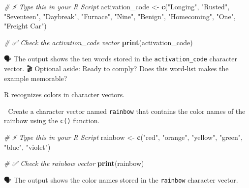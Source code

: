 \documentclass[
  12pt,
]{scrreprt}
\newenvironment{Shaded}{\begin{snugshade}}{\end{snugshade}}
\newcommand{\CommentTok}[1]{\textcolor[rgb]{0.56,0.35,0.01}{\textit{#1}}}
\newcommand{\FunctionTok}[1]{\textcolor[rgb]{0.13,0.29,0.53}{\textbf{#1}}}
\newcommand{\NormalTok}[1]{#1}
\newcommand{\OtherTok}[1]{\textcolor[rgb]{0.56,0.35,0.01}{#1}}
\newcommand{\StringTok}[1]{\textcolor[rgb]{0.31,0.60,0.02}{#1}}
\begin{document}
\begin{Shaded}
\begin{Highlighting}[]
\CommentTok{\# ⚡ Type this in your R Script}
\NormalTok{activation\_code }\OtherTok{\textless{}{-}} \FunctionTok{c}\NormalTok{(}\StringTok{"Longing"}\NormalTok{, }\StringTok{"Rusted"}\NormalTok{, }\StringTok{"Seventeen"}\NormalTok{, }\StringTok{"Daybreak"}\NormalTok{, }\StringTok{"Furnace"}\NormalTok{, }\StringTok{"Nine"}\NormalTok{, }\StringTok{"Benign"}\NormalTok{, }\StringTok{"Homecoming"}\NormalTok{, }\StringTok{"One"}\NormalTok{, }\StringTok{"Freight Car"}\NormalTok{)}
\end{Highlighting}
\end{Shaded}

\begin{Shaded}
\begin{Highlighting}[]
\CommentTok{\# ✅ Check the activation\_code vector}
\FunctionTok{print}\NormalTok{(activation\_code)}
\end{Highlighting}
\end{Shaded}

🗣 The output shows the ten words stored in the \texttt{activation\_code}
character vector. 🎬 Optional aside: Ready to comply? Does this
word-list makes the example memorable?

R recognizes colors in character vectors.

🎯 Create a character vector named \texttt{rainbow} that contains the
color names of the rainbow using the \texttt{c()} function.

\begin{Shaded}
\begin{Highlighting}[]
\CommentTok{\# ⚡ Type this in your R Script}
\NormalTok{rainbow }\OtherTok{\textless{}{-}} \FunctionTok{c}\NormalTok{(}\StringTok{"red"}\NormalTok{, }\StringTok{"orange"}\NormalTok{, }\StringTok{"yellow"}\NormalTok{, }\StringTok{"green"}\NormalTok{, }\StringTok{"blue"}\NormalTok{,  }\StringTok{"violet"}\NormalTok{)}
\end{Highlighting}
\end{Shaded}

\begin{Shaded}
\begin{Highlighting}[]
\CommentTok{\# ✅ Check the rainbow vector}
\FunctionTok{print}\NormalTok{(rainbow)}
\end{Highlighting}
\end{Shaded}

🗣 The output shows the color names stored in the \texttt{rainbow}
character vector.
\end{document}
